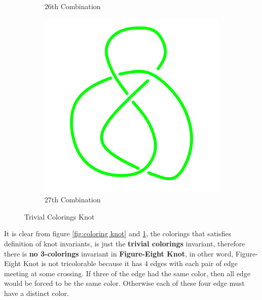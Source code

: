 \documentclass[a4paper,9pt]{article}
\begin{document}
\begin{enumerate}
\begin{figure}[h!]
\begin{subfigure}[b]{0.3\linewidth}
		\caption{26th Combination}
	\end{subfigure}
	\qquad
	\begin{subfigure}[b]{0.3\linewidth}
		\centering
		\includegraphics[width=\linewidth]{picture/knotpict/knot-27}
		\caption{27th Combination}
	\end{subfigure}
	\qquad
	\caption{Trivial Colorings Knot}
	\label{fig:trivialcolor}
\end{figure}
\newline
It is clear from figure \ref{fig:coloring knot} and \ref{fig:trivialcolor}, the colorings that satisfies definition of knot invariants, is just the \textbf{trivial colorings} invariant, therefore there is \textbf{no 3-colorings} invariant in \textbf{Figure-Eight Knot}, in other word, Figure-Eight Knot is not tricolorable because it has 4 edges with each pair of edge meeting at some crossing. If three of the edge had the same color, then all edge would be forced to be the same color. Otherwise each of these four edge must have a distinct color.
\end{enumerate}
\end{document}

